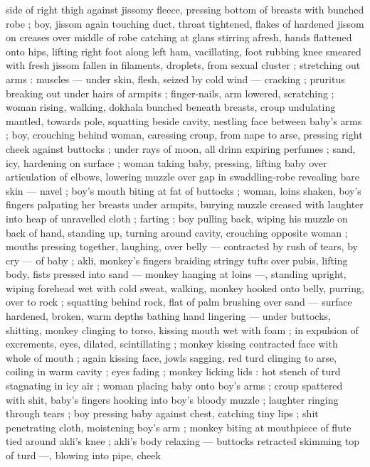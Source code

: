 {side of right thigh against jissomy fleece, pressing bottom of breasts 
with bunched robe ; boy, jissom again touching duct, throat 
tightened, flakes of hardened jissom on creases over middle of robe 
catching at glans stirring afresh, hands flattened onto hips, lifting 
right foot along left ham, vacillating, foot rubbing knee smeared with 
fresh jissom fallen in filaments, droplets, from sexual cluster ; 
stretching out arms : muscles --- under skin, flesh, seized by cold 
wind --- cracking ; pruritus breaking out under hairs of armpits ; 
finger-nails, arm lowered, scratching ; woman rising, walking, 
dokhala bunched beneath breasts, croup undulating mantled, 
towards pole, squatting beside cavity, nestling face between baby's 
arms ; boy, crouching behind woman, caressing croup, from nape to 
arse, pressing right cheek against buttocks ; under rays of moon, all 
drinn expiring perfumes ; sand, icy, hardening on surface ; woman 
taking baby, pressing, lifting baby over articulation of elbows, 
lowering muzzle over gap in swaddling-robe revealing bare skin --- 
navel ; boy's mouth biting at fat of buttocks ; woman, loins shaken, 
boy's fingers palpating her breasts under armpits, burying muzzle 
creased with laughter into heap of unravelled cloth ; farting ; boy 
pulling back, wiping his muzzle on back of hand, standing up, turning 
around cavity, crouching opposite woman ; mouths pressing together, 
laughing, over belly --- contracted by rush of tears, by cry --- of 
baby ; akli, monkey's fingers braiding stringy tufts over pubis, lifting 
body, fists pressed into sand --- monkey hanging at loins ---, 
standing upright, wiping forehead wet with cold sweat, walking, 
monkey hooked onto belly, purring, over to rock ; squatting behind 
rock, flat of palm brushing over sand --- surface hardened, broken, 
warm depths bathing hand lingering --- under buttocks, shitting, 
monkey clinging to torso, kissing mouth wet with foam ; in expulsion 
of excrements, eyes, dilated, scintillating ; monkey kissing 
contracted face with whole of mouth ; again kissing face, jowls 
sagging, red turd clinging to arse, coiling in warm cavity ; eyes fading 
; monkey licking lids : hot stench of turd stagnating in icy air ; woman 
placing baby onto boy's arms ; croup spattered with shit, baby's 
fingers hooking into boy's bloody muzzle ; laughter ringing through 
tears ; boy pressing baby against chest, catching tiny lips ; shit 
penetrating cloth, moistening boy's arm ; monkey biting at 
mouthpiece of flute tied around akli's knee ; akli's body relaxing --- 
buttocks retracted skimming top of turd ---, blowing into pipe, cheek 
}
